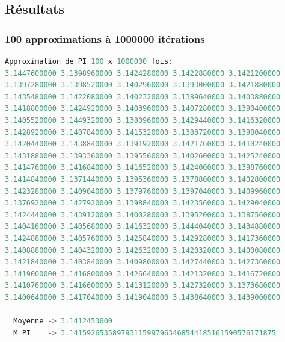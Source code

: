 \documentclass{article}
\begin{document}
\subsection{Résultats}

\subsubsection{100 approximations à 1000000 itérations}
\begin{lstlisting}[language=c++]
  Approximation de PI 100 x 1000000 fois:
3.1447600000 3.1398960000 3.1424280000 3.1422880000 3.1421200000 
3.1397280000 3.1398520000 3.1402960000 3.1393000000 3.1421880000 
3.1435480000 3.1422080000 3.1402320000 3.1389640000 3.1403880000 
3.1418800000 3.1424920000 3.1403960000 3.1407280000 3.1390400000 
3.1405520000 3.1449320000 3.1380960000 3.1429440000 3.1416320000 
3.1428920000 3.1407840000 3.1415320000 3.1383720000 3.1398040000 
3.1420440000 3.1438840000 3.1391920000 3.1421760000 3.1410240000 
3.1431880000 3.1393360000 3.1395560000 3.1402600000 3.1425240000 
3.1414760000 3.1416840000 3.1416520000 3.1424000000 3.1398760000 
3.1414840000 3.1371440000 3.1395360000 3.1378800000 3.1402800000 
3.1423280000 3.1409040000 3.1379760000 3.1397040000 3.1409960000 
3.1376920000 3.1427920000 3.1398840000 3.1423560000 3.1429040000 
3.1424440000 3.1439120000 3.1400280000 3.1395200000 3.1387560000 
3.1404160000 3.1405680000 3.1416320000 3.1444040000 3.1434880000 
3.1424880000 3.1405760000 3.1425840000 3.1429280000 3.1417360000 
3.1408880000 3.1404320000 3.1426320000 3.1420320000 3.1400080000 
3.1421840000 3.1403840000 3.1409800000 3.1427440000 3.1427360000 
3.1419000000 3.1416800000 3.1426640000 3.1421320000 3.1416720000 
3.1410760000 3.1416600000 3.1413120000 3.1427320000 3.1373680000 
3.1400640000 3.1417040000 3.1419040000 3.1438640000 3.1439000000

  Moyenne -> 3.1412453600
  M_PI    -> 3.141592653589793115997963468544185161590576171875
\end{lstlisting}
\end{document}

